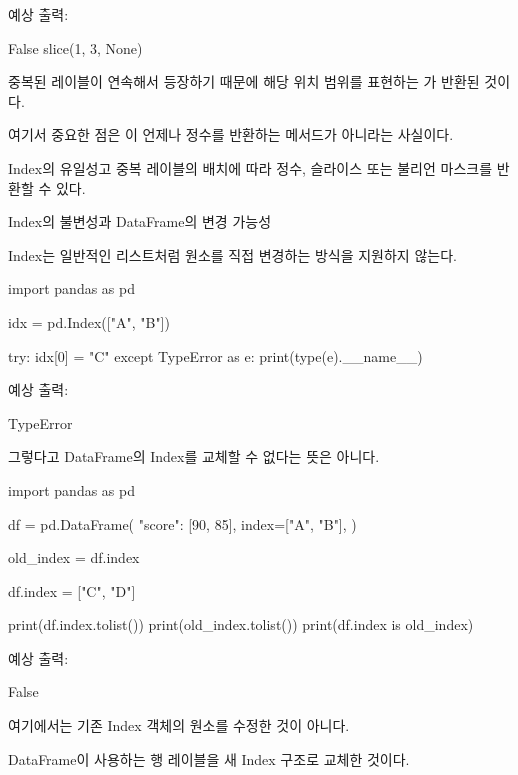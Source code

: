 예상 출력:

\begin{dhkzsh}
False
slice(1, 3, None)
\end{dhkzsh}

중복된 레이블이 연속해서 등장하기 때문에 해당 위치 범위를 표현하는 가 반환된 것이다.

여기서 중요한 점은 이 언제나 정수를 반환하는 메서드가 아니라는 사실이다.

Index의 유일성고 중복 레이블의 배치에 따라 정수, 슬라이스 또는 불리언 마스크를 반환할 수 있다.

\begin{dhknote}
\begin{dhksmry}[centered]
Index의 불변성과 DataFrame의 변경 가능성
\end{dhksmry}
\end{dhknote}

Index는 일반적인 리스트처럼 원소를 직접 변경하는 방식을 지원하지 않는다.

\begin{dhkcode}
import pandas as pd

idx = pd.Index(["A", "B"])

try:
    idx[0] = "C"
except TypeError as e:
    print(type(e).__name__)
\end{dhkcode}

예상 출력:

\begin{dhkzsh}
TypeError
\end{dhkzsh}

그렇다고 DataFrame의 Index를 교체할 수 없다는 뜻은 아니다.

\begin{dhkcode}
import pandas as pd

df = pd.DataFrame(
    {"score": [90, 85]},
    index=["A", "B"],
)

old_index = df.index

df.index = ["C", "D"]

print(df.index.tolist())
print(old_index.tolist())
print(df.index is old_index)
\end{dhkcode}

예상 출력:

\begin{dhkzsh}
['C', 'D']
['A', 'B']
False
\end{dhkzsh}

여기에서는 기존 Index 객체의 원소를 수정한 것이 아니다.

DataFrame이 사용하는 행 레이블을 새 Index 구조로 교체한 것이다.

